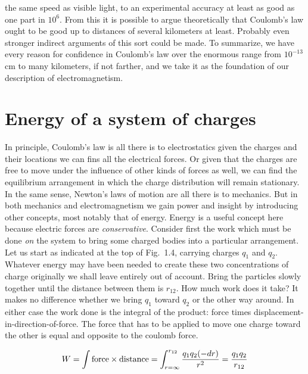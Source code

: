 the same speed as visible light, to an experimental accuracy at least
as good as one part in $10^{6}$. From this it is possible to argue
theoretically that Coulomb's law ought to be good up to distances of
several kilometers at least. Probably even stronger indirect
arguments of this sort could be made.      To summarize, we have
every reason for confidence in Coulomb's law over the enormous range
from $10^{-13}$ cm to many kilometers, if not farther, and we take it
as the foundation of our description of electromagnetism.

\section{Energy of a system of charges}

In principle, Coulomb's law is all there is to electrostatics given
the charges and their locations we can fins all the electrical
forces. Or given that the charges are free to move under the
influence of other kinds of forces as well, we can find the
equilibrium arrangement in which the charge distribution will remain
stationary. In the same sense, Newton's laws of motion are all there
is to mechanics. But in both mechanics and electromagnetism we gain
power and insight by introducing other concepts, most notably that of
energy. Energy is a useful concept here because electric forces are
\emph{conservative}. Consider first the work which must be done
\emph{on} the system to bring some charged bodies into a particular
arrangement. Let us start as indicated at the top of Fig.~1.4,
carrying charges $q_1$ and $q_2$. Whatever energy may have been
needed to create these two concentrations of charge originally we
shall leave entirely out of account. Bring the particles slowly
together until the distance between them is $r_{12}$. How much work
does it take? It makes no difference whether we bring $q_1$ toward
$q_2$ or the other way around. In either case the work done is the
integral of the product: force times
displacement-in-direction-of-force. The force that has to be applied
to move one charge toward the other is equal and opposite to the
coulomb force.

\begin{equation}
  W = \int \text{force}\times\text{distance} 
    = \int_{r=\infty}^{r_{12}} \frac{q_1q_2(-d r)}{r^2} = \frac{q_1q_2}{r_{12}}
\end{equation}

